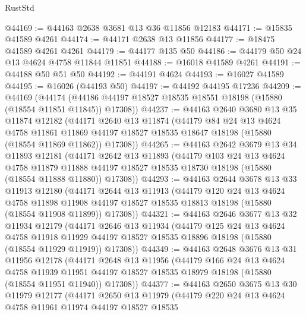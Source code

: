 \begin{lexlean}{RustStd}
\begin{coremodule}
@44169 := @44163 @2638 @3681 @13 @36 @11856 @12183
@44171 := @15835 @41589 @4261
@44174 := @44171 @2638 @13 @11856
@44177 := @18475 @41589 @4261 @4261
@44179 := @44177 @135 @50
@44186 := @44179 @50 @24 @13 @4624 @4758 @11844 @11851
@44188 := @16018 @41589 @4261
@44191 := @44188 @50 @51 @50
@44192 := @44191 @4624
@44193 := @16027 @41589
@44195 := @16026 (@44193 @50)
@44197 := @44192 @44195 @17236
@44209 := @44169
    (@44174 (@44186 @44197 @18527 @18535 @18551 @18198 (@15880 (@18554 @11851 @11845)) @17308))
@44237 := @44163
    @2640
    @3680
    @13
    @35
    @11874
    @12182
    (@44171
      @2640
      @13
      @11874
      (@44179
        @84
        @24
        @13
        @4624
        @4758
        @11861
        @11869
        @44197
        @18527
        @18535
        @18647
        @18198
        (@15880 (@18554 @11869 @11862))
        @17308))
@44265 := @44163
    @2642
    @3679
    @13
    @34
    @11893
    @12181
    (@44171
      @2642
      @13
      @11893
      (@44179
        @103
        @24
        @13
        @4624
        @4758
        @11879
        @11888
        @44197
        @18527
        @18535
        @18730
        @18198
        (@15880 (@18554 @11888 @11880))
        @17308))
@44293 := @44163
    @2644
    @3678
    @13
    @33
    @11913
    @12180
    (@44171
      @2644
      @13
      @11913
      (@44179
        @120
        @24
        @13
        @4624
        @4758
        @11898
        @11908
        @44197
        @18527
        @18535
        @18813
        @18198
        (@15880 (@18554 @11908 @11899))
        @17308))
@44321 := @44163
    @2646
    @3677
    @13
    @32
    @11934
    @12179
    (@44171
      @2646
      @13
      @11934
      (@44179
        @125
        @24
        @13
        @4624
        @4758
        @11918
        @11929
        @44197
        @18527
        @18535
        @18896
        @18198
        (@15880 (@18554 @11929 @11919))
        @17308))
@44349 := @44163
    @2648
    @3676
    @13
    @31
    @11956
    @12178
    (@44171
      @2648
      @13
      @11956
      (@44179
        @166
        @24
        @13
        @4624
        @4758
        @11939
        @11951
        @44197
        @18527
        @18535
        @18979
        @18198
        (@15880 (@18554 @11951 @11940))
        @17308))
@44377 := @44163
    @2650
    @3675
    @13
    @30
    @11979
    @12177
    (@44171
      @2650
      @13
      @11979
      (@44179
        @220
        @24
        @13
        @4624
        @4758
        @11961
        @11974
        @44197
        @18527
        @18535

\end{coremodule}
\end{lexlean}
